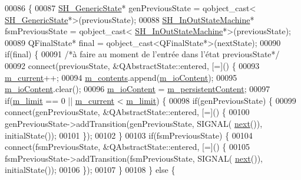 \begin{DoxyCode}
00086 \{
00087     \hyperlink{classSH__GenericState}{SH\_GenericState}* genPreviousState = qobject\_cast<
      \hyperlink{classSH__GenericState}{SH\_GenericState}*>(previousState);
00088     \hyperlink{classSH__InOutStateMachine}{SH\_InOutStateMachine}* fsmPreviousState = qobject\_cast<
      \hyperlink{classSH__InOutStateMachine}{SH\_InOutStateMachine}*>(previousState);
00089     QFinalState* \textcolor{keyword}{final} = qobject\_cast<QFinalState*>(nextState);
00090     \textcolor{keywordflow}{if}(\textcolor{keyword}{final}) \{
00091         \textcolor{comment}{/*à faire au moment de l'entrée dans l'état previousState*/}
00092         connect(previousState, &QAbstractState::entered, [=]() \{
00093             \hyperlink{classSH__LoopingInOutStateMachine_af64f9f28a1b8e82bd9ee5f4b96a7c82e}{m\_current}++;
00094             \hyperlink{classSH__LoopingInOutStateMachine_a145e625dcb4d5438bd9c761eeb9425d4}{m\_contents}.append(\hyperlink{classSH__InOutStateMachine_a8cfbc27eef057bf37b7711bdfef2077e}{m\_ioContent});
00095             \hyperlink{classSH__InOutStateMachine_a8cfbc27eef057bf37b7711bdfef2077e}{m\_ioContent}.clear();
00096             \hyperlink{classSH__InOutStateMachine_a8cfbc27eef057bf37b7711bdfef2077e}{m\_ioContent} = \hyperlink{classSH__LoopingInOutStateMachine_a4e9ea23cf1eecbe26c6ed93b290a9115}{m\_persistentContent};
00097             \textcolor{keywordflow}{if}(\hyperlink{classSH__LoopingInOutStateMachine_a818a60d3691fcac11323ad114c309dcb}{m\_limit} == 0 || \hyperlink{classSH__LoopingInOutStateMachine_af64f9f28a1b8e82bd9ee5f4b96a7c82e}{m\_current} < \hyperlink{classSH__LoopingInOutStateMachine_a818a60d3691fcac11323ad114c309dcb}{m\_limit}) \{
00098                 \textcolor{keywordflow}{if}(genPreviousState) \{
00099                     connect(genPreviousState, &QAbstractState::entered, [=]() \{
00100                         genPreviousState->addTransition(genPreviousState, SIGNAL(
      \hyperlink{classSH__GenericStateMachine_af4771d31d87951c997fba1633c2d67f6}{next}()), initialState());
00101                     \});
00102                 \}
00103                 \textcolor{keywordflow}{if}(fsmPreviousState) \{
00104                     connect(fsmPreviousState, &QAbstractState::entered, [=]() \{
00105                         fsmPreviousState->addTransition(fsmPreviousState, SIGNAL(
      \hyperlink{classSH__GenericStateMachine_af4771d31d87951c997fba1633c2d67f6}{next}()), initialState());
00106                     \});
00107                 \}
00108             \} \textcolor{keywordflow}{else} \{

\end{DoxyCode}
